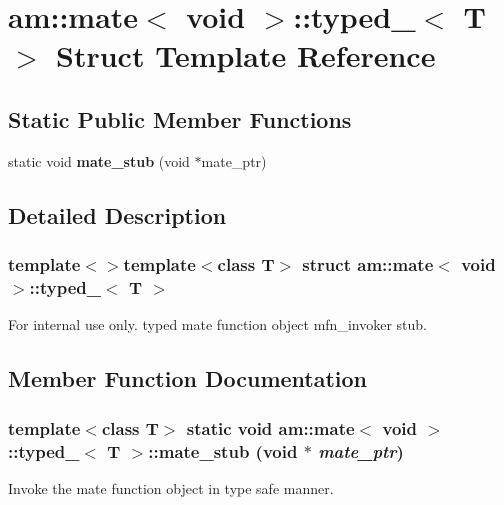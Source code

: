 \section{am::mate$<$ void $>$::typed\_\-$<$ T $>$ Struct Template Reference}
\label{structam_1_1mate_3_01void_01_4_1_1typed__}
\subsection*{Static Public Member Functions}
\begin{CompactItemize}
\item 
static void {\bf mate\_\-stub} (void $\ast$mate\_\-ptr)
\end{CompactItemize}


\subsection{Detailed Description}
\subsubsection*{template$<$$>$template$<$class T$>$ struct am::mate$<$ void $>$::typed\_\-$<$ T $>$}

\begin{Desc}
\item[For internal use only.]
typed mate function object mfn\_\-invoker stub. \end{Desc}




\subsection{Member Function Documentation}
\subsubsection{\setlength{\rightskip}{0pt plus 5cm}template$<$class T$>$ static void {\bf am::mate}$<$ void $>$::typed\_\-$<$ T $>$::mate\_\-stub (void $\ast$ {\em mate\_\-ptr})\hspace{0.3cm}{\tt  [inline, static]}}\label{structam_1_1mate_3_01void_01_4_1_1typed___8346c15870f9a2d06f5acf1d0abd63ba}


Invoke the mate function object in type safe manner.


